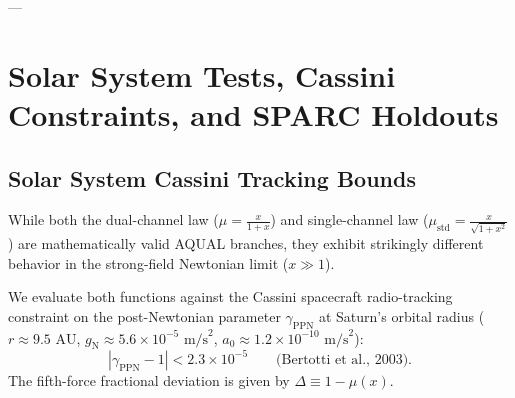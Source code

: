 \documentclass[11pt,a4paper]{article}
\theoremstyle{definition}
\begin{document}
---

\section{Solar System Tests, Cassini Constraints, and SPARC Holdouts}

\subsection{Solar System Cassini Tracking Bounds}
While both the dual-channel law ($\mu = \frac{x}{1+x}$) and single-channel law ($\mu_{\text{std}} = \frac{x}{\sqrt{1+x^2}}$) are mathematically valid AQUAL branches, they exhibit strikingly different behavior in the strong-field Newtonian limit ($x \gg 1$).

We evaluate both functions against the Cassini spacecraft radio-tracking constraint on the post-Newtonian parameter $\gamma_{\text{PPN}}$ at Saturn's orbital radius ($r \approx 9.5\text{ AU}$, $g_{\text{N}} \approx 5.6 \times 10^{-5}\text{ m/s}^2$, $a_0 \approx 1.2 \times 10^{-10}\text{ m/s}^2$):
\begin{equation}
|\gamma_{\text{PPN}} - 1| < 2.3 \times 10^{-5} \qquad \text{(Bertotti et al., 2003)}.
\end{equation}
The fifth-force fractional deviation is given by $\Delta \equiv 1 - \mu(x)$.
\end{document}
